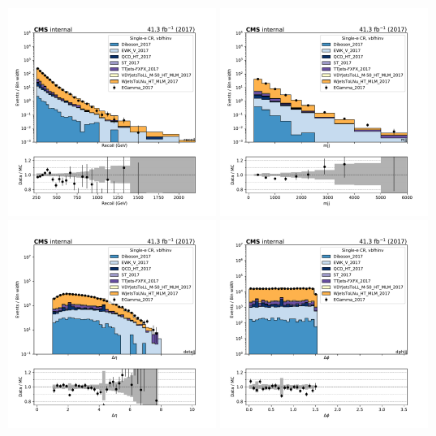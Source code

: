 \begin{figure}[htbp]
    \begin{center}
        \includegraphics[width=0.49\textwidth]{fig/datamc/cr_1e_vbf/cr_1e_vbf_recoil_losf_2017.pdf}
        \includegraphics[width=0.49\textwidth]{fig/datamc/cr_1e_vbf/cr_1e_vbf_mjj_losf_2017.pdf} \\
        \includegraphics[width=0.49\textwidth]{fig/datamc/cr_1e_vbf/cr_1e_vbf_detajj_losf_2017.pdf}
        \includegraphics[width=0.49\textwidth]{fig/datamc/cr_1e_vbf/cr_1e_vbf_dphijj_losf_2017.pdf}

\end{center}
\end{figure}
